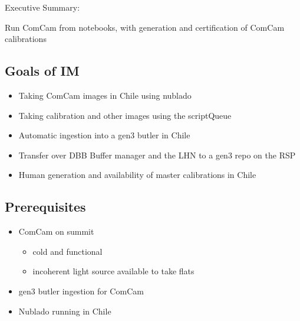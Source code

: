 
Executive Summary:

Run ComCam from notebooks, with generation and certification of ComCam calibrations

\subsection{Goals of IM}

\begin{itemize}
	\item Taking ComCam images in Chile using nublado
	\item Taking calibration and other images using the \gls{scriptQueue}
	\item Automatic ingestion into a gen3 butler in Chile
	\item Transfer over \gls{DBB Buffer manager} and the \gls{LHN} to a gen3 repo on the \gls{RSP}
	\item Human generation and availability of master calibrations in Chile
\end{itemize}

\subsection{Prerequisites}
\begin{itemize}
	\item{ComCam on summit}
	\begin{itemize}
		\item cold and functional
		\item incoherent light source available to take flats
	\end{itemize}
	\item{gen3 butler ingestion for ComCam}
\item{Nublado running in Chile}
\end{itemize}

